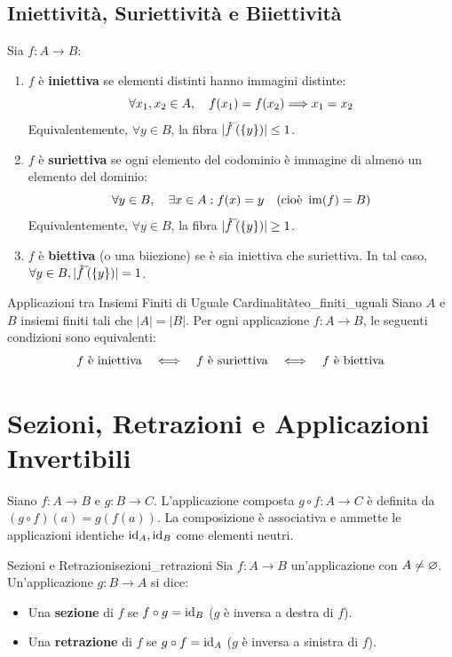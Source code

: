\subsection{Iniettività, Suriettività e Biiettività}
Sia $f: A \to B$:
\begin{enumerate}
    \item $f$ è \textbf{iniettiva} se elementi distinti hanno immagini distinte:
    \[
        \forall x_1, x_2 \in A, \quad f(x_1) = f(x_2) \Longrightarrow x_1 = x_2
    \]
    Equivalentemente, $\forall y \in B$, la fibra $|\antivecf(\{y\})| \le 1$.
    \item $f$ è \textbf{suriettiva} se ogni elemento del codominio è immagine di almeno un elemento del dominio:
    \[
        \forall y \in B, \quad \exists x \in A : f(x) = y \quad (\text{cioè } \operatorname{im}(f) = B)
    \]
    Equivalentemente, $\forall y \in B$, la fibra $|\antivecf(\{y\})| \ge 1$.
    \item $f$ è \textbf{biettiva} (o una biiezione) se è sia iniettiva che suriettiva. In tal caso, $\forall y \in B, |\antivecf(\{y\})| = 1$.
\end{enumerate}

\begin{teorema}{Applicazioni tra Insiemi Finiti di Uguale Cardinalità}{teo_finiti_uguali}
Siano $A$ e $B$ insiemi finiti tali che $|A| = |B|$. Per ogni applicazione $f: A \to B$, le seguenti condizioni sono equivalenti:
\[
    f \text{ è iniettiva} \quad \Longleftrightarrow \quad f \text{ è suriettiva} \quad \Longleftrightarrow \quad f \text{ è biettiva}
\]
\end{teorema}

\section{Sezioni, Retrazioni e Applicazioni Invertibili}

Siano $f: A \to B$ e $g: B \to C$. L'applicazione composta $g \circ f: A \to C$ è definita da $(g \circ f)(a) = g(f(a))$. La composizione è associativa e ammette le applicazioni identiche $\operatorname{id}_A, \operatorname{id}_B$ come elementi neutri.

\begin{definizione}{Sezioni e Retrazioni}{sezioni_retrazioni}
Sia $f: A \to B$ un'applicazione con $A \neq \varnothing$. Un'applicazione $g: B \to A$ si dice:
\begin{itemize}
    \item Una \textbf{sezione} di $f$ se $f \circ g = \operatorname{id}_B$ ($g$ è inversa a destra di $f$).
    \item Una \textbf{retrazione} di $f$ se $g \circ f = \operatorname{id}_A$ ($g$ è inversa a sinistra di $f$).
\end{itemize}
\end{definizione}

